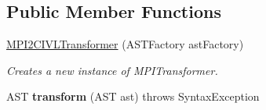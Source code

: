 \subsection*{Public Member Functions}
\begin{DoxyCompactItemize}
\item 
\hyperlink{classedu_1_1udel_1_1cis_1_1vsl_1_1civl_1_1transform_1_1IF_1_1MPI2CIVLTransformer_a10011a30eb5b79a0de0c55c518a5192e}{M\+P\+I2\+C\+I\+V\+L\+Transformer} (A\+S\+T\+Factory ast\+Factory)
\begin{DoxyCompactList}\small\item\em Creates a new instance of M\+P\+I\+Transformer. \end{DoxyCompactList}\item 
\hypertarget{classedu_1_1udel_1_1cis_1_1vsl_1_1civl_1_1transform_1_1IF_1_1MPI2CIVLTransformer_a41b51964b17a3fd1c1aea2cd68d0bbfa}{}A\+S\+T {\bfseries transform} (A\+S\+T ast)  throws Syntax\+Exception \label{classedu_1_1udel_1_1cis_1_1vsl_1_1civl_1_1transform_1_1IF_1_1MPI2CIVLTransformer_a41b51964b17a3fd1c1aea2cd68d0bbfa}

\end{DoxyCompactItemize}
